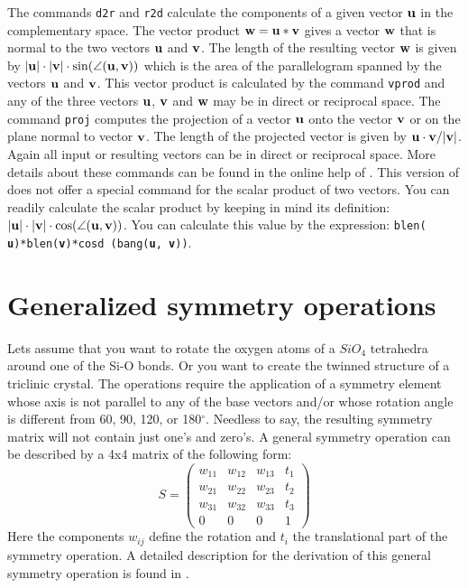 The commands {\tt d2r} and {\tt r2d} calculate the components of a
given vector ${\bf u}$ in the complementary space. The vector
product ${\bf w} = {\bf u} \ast {\bf v}$ gives a vector ${\bf w}$
that is normal to the two vectors ${\bf u}$ and ${\bf v}$. The
length of the resulting vector ${\bf w}$ is given by $|{\bf u}|
\cdot |{\bf v}| \cdot \sin (\angle ({\bf u},{\bf v}))$ which is the
area of the parallelogram spanned by the vectors ${\bf u}$ and ${\bf
v}$. This vector product is calculated by the command {\tt vprod}
and any of the three vectors ${\bf u}$, ${\bf v}$ and ${\bf w}$ may
be in direct or reciprocal space. The command {\tt proj} computes
the projection of a vector ${\bf u}$ onto the vector ${\bf v}$ or on
the plane normal to vector ${\bf v}$. The length of the projected
vector is given by ${\bf u} \cdot {\bf v} / |{\bf v}|$. Again all
input or resulting vectors can be in direct or reciprocal space.
More details about these commands can be found in the online help of
\discus. This version of \Discus does not offer a special
command for the scalar product of two vectors. You can readily
calculate the scalar product by keeping in mind its definition:
$|{\bf u}| \cdot |{\bf v}| \cdot \cos (\angle ({\bf u},{\bf v}))$.
You can calculate this value by the expression: {\tt blen({\bf
u})*blen({\bf v})*cosd (bang({\bf u}, {\bf v}))}.


\section{Generalized symmetry operations \label{cryst-sym}}

Lets assume that you want to rotate the oxygen atoms of a $SiO_{4}$
tetrahedra around one of the Si-O bonds.  Or you want to create the
twinned structure of a triclinic crystal.  The operations require
the application of a symmetry element whose axis is not parallel to
any of the base vectors and/or whose rotation angle is different
from 60, 90, 120, or 180$^{\circ}$. Needless to say, the resulting
symmetry matrix will not contain just one's and zero's. A general
symmetry operation can be described by a 4x4 matrix of the following
form:
%
\begin{equation}
    S = \left (
        \begin{array}{cccc}
                w_{11} & w_{12} & w_{13} & t_{1}  \\
                w_{21} & w_{22} & w_{23} & t_{2}  \\
                w_{31} & w_{32} & w_{33} & t_{3}  \\
                0 & 0 & 0 & 1
        \end{array} \right )
        \label{cry-eq1}
\end{equation}
%
Here the components $w_{ij}$ define the rotation and $t_{i}$ the
translational part of the symmetry operation.  A detailed
description for the derivation of this general symmetry operation
is found in \citet{sands}.\par

